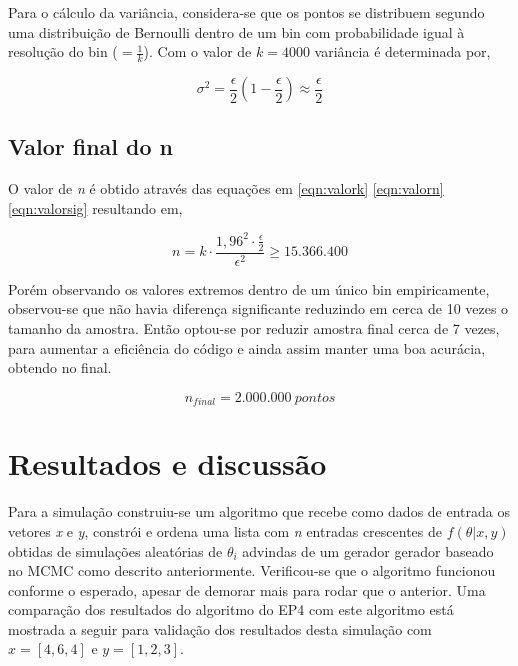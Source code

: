 \documentclass{article}
\begin{document}
\indent Para o cálculo da variância, considera-se que os pontos se distribuem segundo uma distribuição de Bernoulli dentro de um bin com probabilidade igual à resolução do bin ($= \frac{1}{k}$). Com o valor de $k = 4000$ variância é determinada por,

\begin{equation}
    \sigma^2 = \frac{\epsilon}{2} (1 - \frac{\epsilon}{2}) \approx \frac{\epsilon}{2}
    \label{eqn:valorsig}
\end{equation}

\subsection{Valor final do n}
\indent
O valor de \textit{n} é obtido através das equações em \ref{eqn:valork} \ref{eqn:valorn} \ref{eqn:valorsig} resultando em,

\begin{equation*}
    n = k \cdot \frac{1,96^2\cdot \frac{\epsilon}{2}}{\epsilon^2} \geq 15.366.400
\end{equation*}

Porém observando os valores extremos dentro de um único bin empiricamente, observou-se que não havia diferença significante reduzindo em cerca de 10 vezes o tamanho da amostra.
Então optou-se por reduzir amostra final cerca de 7 vezes, para aumentar a eficiência do código e ainda assim manter uma boa acurácia, obtendo no final.

\[
    n_{final} = 2.000.000 \ pontos
\]

\section{Resultados e discussão}

\indent Para a simulação construiu-se um algoritmo que recebe como dados de entrada os vetores \textit{x} e \textit{y}, constrói e ordena uma lista com \textit{n} entradas crescentes de $f(\theta|x,y)$ obtidas de simulações aleatórias de $\theta_i$ advindas de um gerador gerador baseado no MCMC como descrito anteriormente. Verificou-se que o algoritmo funcionou conforme o esperado, apesar de demorar mais para rodar que o anterior. Uma comparação dos resultados do algoritmo do EP4 com este algoritmo está mostrada a seguir para validação dos resultados desta simulação com $x = [4,6,4]$ e $y = [1,2,3]$.
\end{document}
